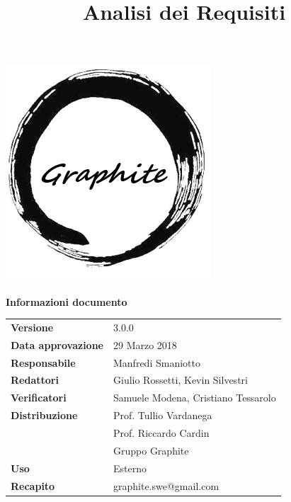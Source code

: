 \label{key}\documentclass[openany,12pt,a4paper]{report}
\title{Analisi dei Requisiti}
\author{}
\newcommand{\versione}{3.0.0}
\begin{document}
	
	\makeatletter
	\begin{titlepage}
		\setlength{\headsep}{0pt}  
		\begin{center}			
			\includegraphics[width=0.5\linewidth]{Logo.png}\\[1em]
			{\huge \bfseries  \@title }\\[10ex]
			\textbf{\Large Informazioni documento} \\[2em]
			\bgroup
			\def\arraystretch{1.5}
			\begin{tabular}{l|l}
				\textbf{Versione} & \versione{} \\
				\textbf{Data approvazione} & 29 Marzo 2018 \\
				\textbf{Responsabile} & Manfredi Smaniotto \\
				\textbf{Redattori} & Giulio Rossetti, Kevin Silvestri \\
				\textbf{Verificatori} & Samuele Modena, Cristiano Tessarolo \\
				\textbf{Distribuzione} & Prof. Tullio Vardanega \\
				 & Prof. Riccardo Cardin \\
				 & Gruppo Graphite \\
				\textbf{Uso} & Esterno \\
				\textbf{Recapito} & graphite.swe@gmail.com \\
			\end{tabular}
		\egroup
		\end{center}
	\end{titlepage}
	\makeatother

	\thispagestyle{empty}
	\newpage
	
	
	
	\tableofcontents
	\listoffigures
	\listoftables
	
	
	
	
	
	
	
\end{document}
